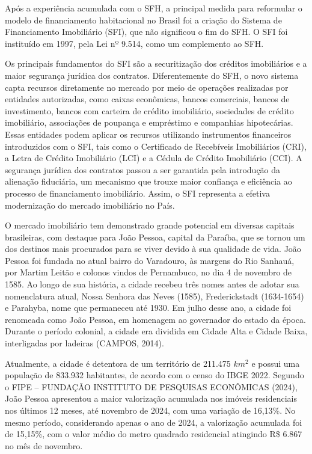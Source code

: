 \documentclass[
  12pt,
  a4paper,
]{scrreprt}
\begin{document}
\vspace{12pt}

Após a experiência acumulada com o SFH, a principal medida para
reformular o modelo de financiamento habitacional no Brasil foi a
criação do Sistema de Financiamento Imobiliário (SFI), que não
significou o fim do SFH. O SFI foi instituído em 1997, pela Lei nº
9.514, como um complemento ao SFH.

\vspace{12pt}

Os principais fundamentos do SFI são a securitização dos créditos
imobiliários e a maior segurança jurídica dos contratos. Diferentemente
do SFH, o novo sistema capta recursos diretamente no mercado por meio de
operações realizadas por entidades autorizadas, como caixas econômicas,
bancos comerciais, bancos de investimento, bancos com carteira de
crédito imobiliário, sociedades de crédito imobiliário, associações de
poupança e empréstimo e companhias hipotecárias. Essas entidades podem
aplicar os recursos utilizando instrumentos financeiros introduzidos com
o SFI, tais como o Certificado de Recebíveis Imobiliários (CRI), a Letra
de Crédito Imobiliário (LCI) e a Cédula de Crédito Imobiliário (CCI). A
segurança jurídica dos contratos passou a ser garantida pela introdução
da alienação fiduciária, um mecanismo que trouxe maior confiança e
eficiência ao processo de financiamento imobiliário. Assim, o SFI
representa a efetiva modernização do mercado imobiliário no País.

\vspace{12pt}

O mercado imobiliário tem demonstrado grande potencial em diversas
capitais brasileiras, com destaque para João Pessoa, capital da Paraíba,
que se tornou um dos destinos mais procurados para se viver devido à sua
qualidade de vida. João Pessoa foi fundada no atual bairro do Varadouro,
às margens do Rio Sanhauá, por Martim Leitão e colonos vindos de
Pernambuco, no dia 4 de novembro de 1585. Ao longo de sua história, a
cidade recebeu três nomes antes de adotar sua nomenclatura atual, Nossa
Senhora das Neves (1585), Frederickstadt (1634-1654) e Parahyba, nome
que permaneceu até 1930. Em julho desse ano, a cidade foi renomeada como
João Pessoa, em homenagem ao governador do estado da época. Durante o
período colonial, a cidade era dividida em Cidade Alta e Cidade Baixa,
interligadas por ladeiras (CAMPOS, 2014).

\vspace{12pt}

Atualmente, a cidade é detentora de um território de 211.475 \(km^2\) e
possui uma população de 833.932 habitantes, de acordo com o censo do
IBGE 2022. Segundo o FIPE -- FUNDAÇÃO INSTITUTO DE PESQUISAS ECONÔMICAS
(2024), João Pessoa apresentou a maior valorização acumulada nos imóveis
residenciais nos últimos 12 meses, até novembro de 2024, com uma
variação de 16,13\%. No mesmo período, considerando apenas o ano de
2024, a valorização acumulada foi de 15,15\%, com o valor médio do metro
quadrado residencial atingindo R\$ 6.867 no mês de novembro.
\end{document}
